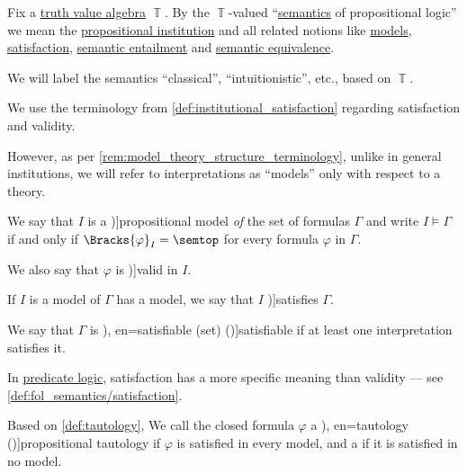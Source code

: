\begin{definition}\label{def:propositional_semantics}\mimprovised
  Fix a \hyperref[def:truth_value_algebra]{truth value algebra} \( \BbbT \). By the \( \BbbT \)-valued \enquote{\hyperref[con:syntax_semantics_duality]{semantics} of propositional logic} we mean the \hyperref[def:propositional_institution]{propositional institution} and all related notions like \hyperref[def:institution/models]{models}, \hyperref[def:institution/satisfaction]{satisfaction}, \hyperref[def:institutional_entailment]{semantic entailment} and \hyperref[def:semantic_equivalence]{semantic equivalence}.

  We will label the semantics \enquote{classical}, \enquote{intuitionistic}, etc., based on \( \BbbT \).

  \begin{thmenum}
     We use the terminology from \cref{def:institutional_satisfaction} regarding satisfaction and validity.

    However, as per \cref{rem:model_theory_structure_terminology}, unlike in general institutions, we will refer to interpretations as \enquote{models} only with respect to a theory.

    We say that \( I \) is a \term[en=model (\cite[def. 1.4.1(i)]{Hinman2005Logic})]{propositional model} \emph{of} the set of formulas \( \Gamma \) and write \( I \vDash \Gamma \) if and only if \( \Bracks{\varphi}_I = \semtop \) for every formula \( \varphi \) in \( \Gamma \).

    We also say that \( \varphi \) is \term[en=valid (\cite[70]{VanDalen2004LogicAndStructure})]{valid} in \( I \).

     If \( I \) is a model of \( \Gamma \) has a model, we say that \( I \) \term[en=satisfies (\cite[def. 1.4.1(i)]{Hinman2005Logic})]{satisfies} \( \Gamma \).

    We say that \( \Gamma \) is \term[ru=выполнимая (формула) (\cite[def. 1.1.14]{Герасимов2014Вычислимость}), en=satisfiable (set) (\cite[def. 1.4.8(i)]{Hinman2005Logic})]{satisfiable} if at least one interpretation satisfies it.

    In \hyperref[con:predicate_logic]{predicate logic}, satisfaction has a more specific meaning than validity --- see \cref{def:fol_semantics/satisfaction}.

     Based on \cref{def:tautology}, We call the closed formula \( \varphi \) a \term[ru=тавтология (\cite[def. 1.1.14]{Герасимов2014Вычислимость}), en=tautology (\cite[def. 1.2.4]{VanDalen2004LogicAndStructure})]{propositional tautology} if \( \varphi \) is satisfied in every model, and a  if it is satisfied in no model.


\end{thmenum}
\end{definition}

